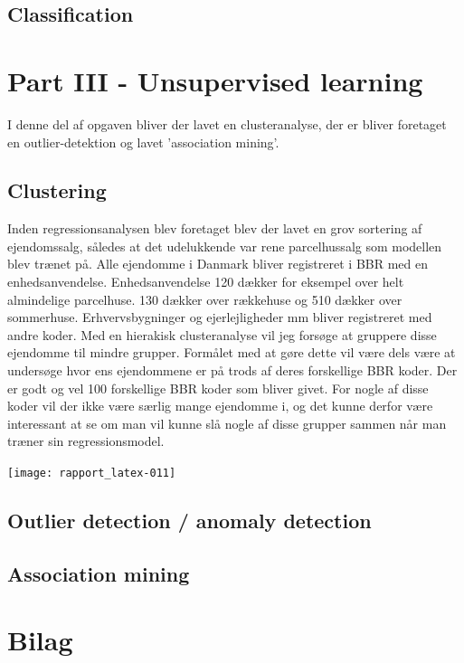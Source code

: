 \documentclass{report}
\begin{document}
\section{Classification}

\chapter{Part III - Unsupervised learning}
I denne del af opgaven bliver der lavet en clusteranalyse, der er bliver foretaget en outlier-detektion og lavet 'association mining'. 

\section{Clustering}

Inden regressionsanalysen blev foretaget blev der lavet en grov sortering af ejendomssalg, således at det udelukkende var rene parcelhussalg som modellen blev trænet på. 
Alle ejendomme i Danmark bliver registreret i BBR med en enhedsanvendelse. Enhedsanvendelse 120 dækker for eksempel over helt almindelige parcelhuse. 130 dækker over rækkehuse og 510 dækker over sommerhuse. Erhvervsbygninger og ejerlejligheder mm bliver registreret med andre koder. 
Med en hierakisk clusteranalyse vil jeg forsøge at gruppere disse ejendomme til mindre grupper. Formålet med at gøre dette vil være dels være at undersøge hvor ens ejendommene er på trods af deres forskellige BBR koder. Der er godt og vel 100 forskellige BBR koder som bliver givet. For nogle af disse koder vil der ikke være særlig mange ejendomme i, og det kunne derfor være interessant at se om man vil kunne slå nogle af disse grupper sammen når man træner sin regressionsmodel.

\texttt{[image: rapport\_latex-011]}


\section{Outlier detection / anomaly detection}

\section{Association mining}

\chapter{Bilag}
\end{document}
